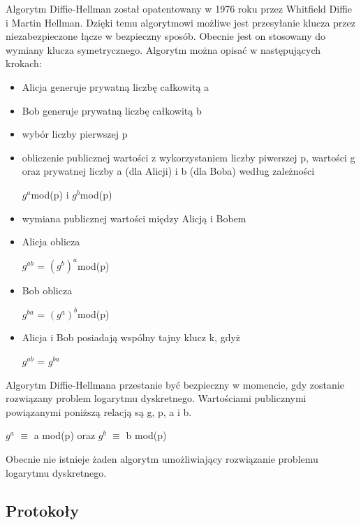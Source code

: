 \documentclass[12p]{article}
\begin{document}
Algorytm Diffie-Hellman został opatentowany w 1976 roku przez Whitfield Diffie i Martin Hellman. Dzięki temu algorytmowi możliwe jest przesyłanie klucza przez niezabezpieczone łącze w bezpieczny sposób. Obecnie jest on stosowany do wymiany klucza symetrycznego. Algorytm można opisać w następujących krokach: 
\begin{itemize}
\item Alicja generuje prywatną liczbę całkowitą a
\item Bob generuje prywatną liczbę całkowitą b
\item wybór liczby pierwszej p
\item obliczenie publicznej wartości z wykorzystaniem liczby piwerszej p, wartości g oraz prywatnej liczby a (dla Alicji) i b (dla Boba) według zależności
\begin{center}
$g^{a}$mod(p) i $g^{b}$mod(p)
\end{center}
\item wymiana publicznej wartości między Alicją i Bobem
\item Alicja oblicza
\begin{center}
$g^{ab}$ = $(g^{b})^{a}$mod(p)
\end{center}
\item Bob oblicza
\begin{center}
$g^{ba}$ = $(g^{a})^{b}$mod(p)
\end{center}
\item Alicja i Bob posiadają wspólny tajny klucz k, gdyż
\begin{center}
$g^{ab}$ = $g^{ba}$
\end{center}
\end{itemize}

Algorytm Diffie-Hellmana przestanie być bezpieczny w momencie, gdy zostanie rozwiązany problem logarytmu dyskretnego. Wartościami publicznymi powiązanymi poniższą relacją są g, p, a i b.
\begin{center}
$g^{a}$ $\equiv$ a mod(p) oraz $g^{b}$ $\equiv$ b mod(p)
\end{center}
Obecnie nie istnieje żaden algorytm umożliwiający rozwiązanie problemu logarytmu dyskretnego.~\cite{DH}


\subsection{Protokoły}
\end{document}
